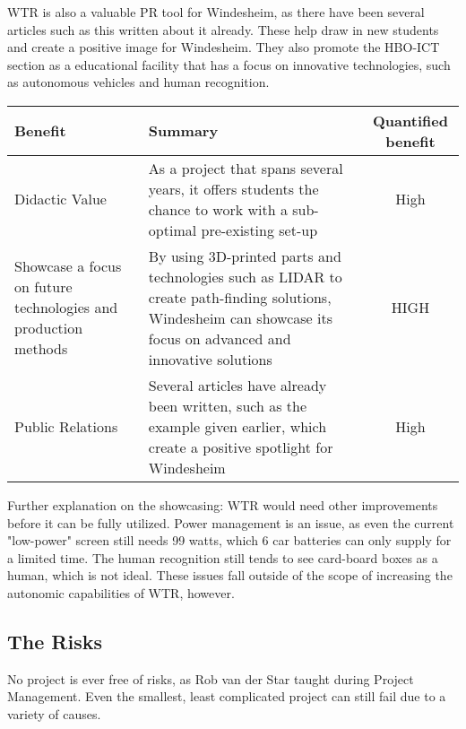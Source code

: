 WTR is also a valuable PR tool for Windesheim, as there have been several articles such as this \cite{stentorwilly} written about it already.
These help draw in new students and create a positive image for Windesheim.
They also promote the HBO-ICT section as a educational facility that has a focus on innovative technologies, such as autonomous vehicles and human recognition.

\begin{tabular}{|L{6cm}|L{6cm}|c|}
\hline
Benefit & Summary & Quantified benefit \\ \hline
Didactic Value & As a project that spans several years, it offers students the chance to work with a sub-optimal pre-existing set-up & High \\ \hline
Showcase a focus on future technologies and production methods & By using 3D-printed parts and technologies such as LIDAR to create path-finding solutions, Windesheim can showcase its focus on advanced and innovative solutions & HIGH \\ \hline
Public Relations & Several articles have already been written, such as the example given earlier, which create a positive spotlight for Windesheim & High \\ \hline
\end{tabular}

Further explanation on the showcasing: WTR would need other improvements before it can be fully utilized.
Power management is an issue, as even the current "low-power" screen still needs 99 watts, which 6 car batteries can only supply for a limited time.
The human recognition still tends to see card-board boxes as a human, which is not ideal.
These issues fall outside of the scope of increasing the autonomic capabilities of WTR, however.

\clearpage
\subsection{The Risks}
No project is ever free of risks, as Rob van der Star taught during Project Management.
Even the smallest, least complicated project can still fail due to a variety of causes.

